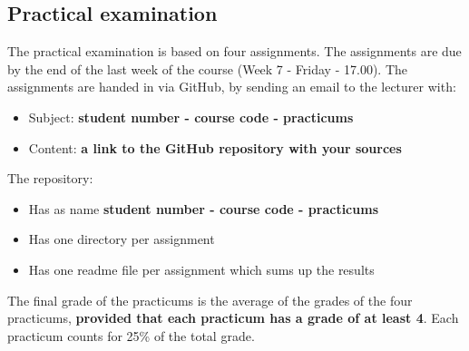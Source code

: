 	\subsection{Practical examination}
		The practical examination is based on four assignments. The assignments are due by the end of the last week of the course (Week 7 - Friday - 17.00). The assignments are handed in via GitHub, by sending an email to the lecturer with:
		
		\begin{itemize}
			\item Subject: \textbf{student number - course code - practicums}
			\item Content: \textbf{a link to the GitHub repository with your sources}			
		\end{itemize}
		
		The repository:
		
		\begin{itemize}
			\item Has as name \textbf{student number - course code - practicums}
			\item Has one directory per assignment
			\item Has one readme file per assignment which sums up the results
		\end{itemize}
		
		The final grade of the practicums is the average of the grades of the four practicums, \textbf{provided that each practicum has a grade of at least 4}. Each practicum counts for 25\% of the total grade.
